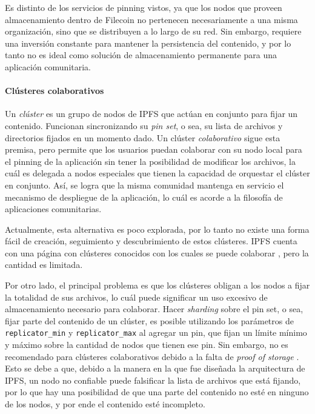Es distinto de los servicios de pinning vistos, ya que los nodos que proveen almacenamiento dentro de Filecoin no pertenecen necesariamente a una misma organización, sino que se distribuyen a lo largo de su red. Sin embargo, requiere una inversión constante para mantener la persistencia del contenido, y por lo tanto no es ideal como solución de almacenamiento permanente para una aplicación comunitaria.

\paragraph{Clústeres colaborativos}

Un \textit{clúster} es un grupo de nodos de IPFS que actúan en conjunto para fijar un contenido. Funcionan sincronizando su \textit{pin set}, o sea, su lista de archivos y directorios fijados en un momento dado. Un clúster \textit{colaborativo} sigue esta premisa, pero permite que los usuarios puedan colaborar con su nodo local para el pinning de la aplicación sin tener la posibilidad de modificar los archivos, la cuál es delegada a nodos especiales que tienen la capacidad de orquestar el clúster en conjunto. Así, se logra que la misma comunidad mantenga en servicio el mecanismo de despliegue de la aplicación, lo cuál es acorde a la filosofía de aplicaciones comunitarias.

Actualmente, esta alternativa es poco explorada, por lo tanto no existe una forma fácil de creación, seguimiento y descubrimiento de estos clústeres. IPFS cuenta con una página con clústeres conocidos con los cuales se puede colaborar \cite{collaborative-clusters}, pero la cantidad es limitada.

Por otro lado, el principal problema es que los clústeres obligan a los nodos a fijar la totalidad de sus archivos, lo cuál puede significar un uso excesivo de almacenamiento necesario para colaborar. Hacer \textit{sharding} sobre el pin set, o sea, fijar parte del contenido de un clúster, es posible utilizando los parámetros de \texttt{replicator\_min} y \texttt{replicator\_max} al agregar un pin, que fijan un límite mínimo y máximo sobre la cantidad de nodos que tienen ese pin. Sin embargo, no es recomendado para clústeres colaborativos debido a la falta de \textit{proof of storage} \cite{cluster-sharding} \cite{collaborative-clusters-setup}. Esto se debe a que, debido a la manera en la que fue diseñada la arquitectura de IPFS, un nodo no confiable puede falsificar la lista de archivos que está fijando, por lo que hay una posibilidad de que una parte del contenido no esté en ninguno de los nodos, y por ende el contenido esté incompleto.

